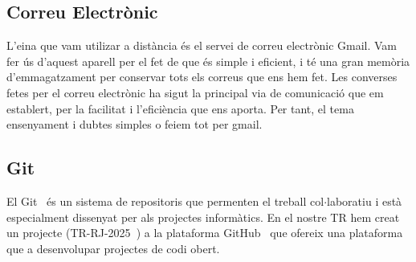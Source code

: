\subsection{Correu Electrònic}
L'eina que vam utilizar a distància és el servei de correu electrònic Gmail. Vam fer ús d'aquest aparell per el fet de que és simple i eficient, i té una gran memòria d'emmagatzament per conservar tots els correus que ens hem fet.
Les converses fetes per el correu electrònic ha sigut la principal via de comunicació que em establert, per la facilitat i l'eficiència que ens aporta. Per tant, el tema ensenyament i dubtes simples o feiem tot per gmail.

\subsection{Git}
El Git~\cite{git} és un sistema de repositoris que permenten el treball col$\cdot$laboratiu i està especialment dissenyat per als projectes informàtics. En el nostre TR hem creat un projecte (TR-RJ-2025~\cite{TR-RJ-2025}) a
la plataforma GitHub~\cite{GitHub} que ofereix una plataforma que a desenvolupar projectes de codi obert.



